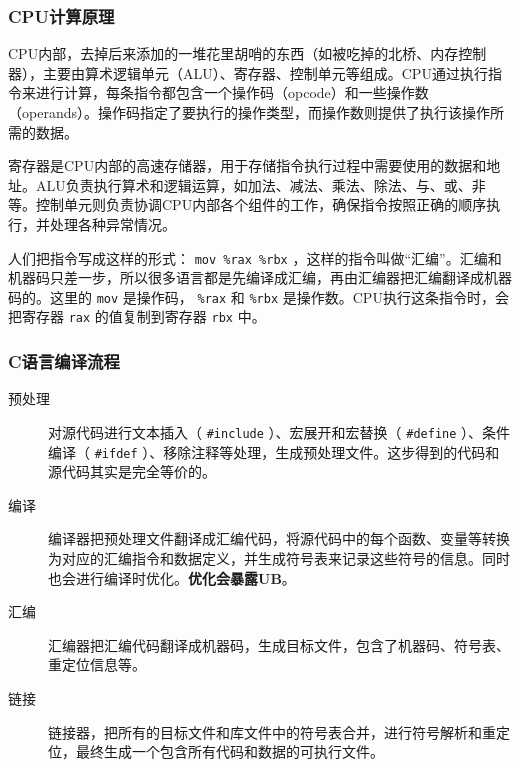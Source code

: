 \documentclass[fontset=none,aspectratio=1610]{ctexbeamer}
\begin{document}
\begin{frame}
    \frametitle{CPU计算原理}

    CPU内部，去掉后来添加的一堆花里胡哨的东西（如被吃掉的北桥、内存控制器），主要由算术逻辑单元（ALU）、寄存器、控制单元等组成。CPU通过执行指令来进行计算，每条指令都包含一个操作码（opcode）和一些操作数（operands）。操作码指定了要执行的操作类型，而操作数则提供了执行该操作所需的数据。

    寄存器是CPU内部的高速存储器，用于存储指令执行过程中需要使用的数据和地址。ALU负责执行算术和逻辑运算，如加法、减法、乘法、除法、与、或、非等。控制单元则负责协调CPU内部各个组件的工作，确保指令按照正确的顺序执行，并处理各种异常情况。

    人们把指令写成这样的形式： \texttt{mov \%rax \%rbx} ，这样的指令叫做“汇编”。汇编和机器码只差一步，所以很多语言都是先编译成汇编，再由汇编器把汇编翻译成机器码的。这里的 \texttt{mov} 是操作码， \texttt{\%rax} 和 \texttt{\%rbx} 是操作数。CPU执行这条指令时，会把寄存器 \texttt{rax} 的值复制到寄存器 \texttt{rbx} 中。

\end{frame}

\begin{frame}
    \frametitle{C语言编译流程}

    \begin{description}
        \item[预处理] 对源代码进行文本插入（ \texttt{\#include} ）、宏展开和宏替换（ \texttt{\#define} ）、条件编译（ \texttt{\#ifdef} ）、移除注释等处理，生成预处理文件。这步得到的代码和源代码其实是完全等价的。
        \item[编译] 编译器把预处理文件翻译成汇编代码，将源代码中的每个函数、变量等转换为对应的汇编指令和数据定义，并生成符号表来记录这些符号的信息。同时也会进行编译时优化。\textbf{优化会暴露UB}。
        \item[汇编] 汇编器把汇编代码翻译成机器码，生成目标文件，包含了机器码、符号表、重定位信息等。
        \item[链接] 链接器，把所有的目标文件和库文件中的符号表合并，进行符号解析和重定位，最终生成一个包含所有代码和数据的可执行文件。 
    \end{description}

\end{frame}
\end{document}
